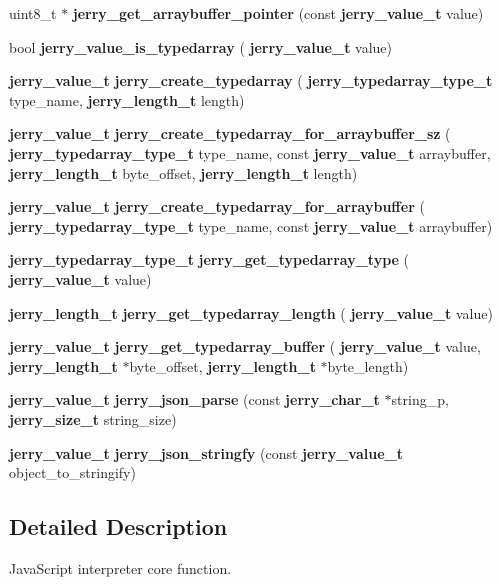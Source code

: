\begin{DoxyCompactItemize}
\item 
uint8\+\_\+t $\ast$ {\bfseries jerry\+\_\+get\+\_\+arraybuffer\+\_\+pointer} (const \textbf{ jerry\+\_\+value\+\_\+t} value)
\item 
bool {\bfseries jerry\+\_\+value\+\_\+is\+\_\+typedarray} (\textbf{ jerry\+\_\+value\+\_\+t} value)
\item 
\textbf{ jerry\+\_\+value\+\_\+t} {\bfseries jerry\+\_\+create\+\_\+typedarray} (\textbf{ jerry\+\_\+typedarray\+\_\+type\+\_\+t} type\+\_\+name, \textbf{ jerry\+\_\+length\+\_\+t} length)
\item 
\textbf{ jerry\+\_\+value\+\_\+t} {\bfseries jerry\+\_\+create\+\_\+typedarray\+\_\+for\+\_\+arraybuffer\+\_\+sz} (\textbf{ jerry\+\_\+typedarray\+\_\+type\+\_\+t} type\+\_\+name, const \textbf{ jerry\+\_\+value\+\_\+t} arraybuffer, \textbf{ jerry\+\_\+length\+\_\+t} byte\+\_\+offset, \textbf{ jerry\+\_\+length\+\_\+t} length)
\item 
\textbf{ jerry\+\_\+value\+\_\+t} {\bfseries jerry\+\_\+create\+\_\+typedarray\+\_\+for\+\_\+arraybuffer} (\textbf{ jerry\+\_\+typedarray\+\_\+type\+\_\+t} type\+\_\+name, const \textbf{ jerry\+\_\+value\+\_\+t} arraybuffer)
\item 
\textbf{ jerry\+\_\+typedarray\+\_\+type\+\_\+t} {\bfseries jerry\+\_\+get\+\_\+typedarray\+\_\+type} (\textbf{ jerry\+\_\+value\+\_\+t} value)
\item 
\textbf{ jerry\+\_\+length\+\_\+t} {\bfseries jerry\+\_\+get\+\_\+typedarray\+\_\+length} (\textbf{ jerry\+\_\+value\+\_\+t} value)
\item 
\textbf{ jerry\+\_\+value\+\_\+t} {\bfseries jerry\+\_\+get\+\_\+typedarray\+\_\+buffer} (\textbf{ jerry\+\_\+value\+\_\+t} value, \textbf{ jerry\+\_\+length\+\_\+t} $\ast$byte\+\_\+offset, \textbf{ jerry\+\_\+length\+\_\+t} $\ast$byte\+\_\+length)
\item 
\textbf{ jerry\+\_\+value\+\_\+t} {\bfseries jerry\+\_\+json\+\_\+parse} (const \textbf{ jerry\+\_\+char\+\_\+t} $\ast$string\+\_\+p, \textbf{ jerry\+\_\+size\+\_\+t} string\+\_\+size)
\item 
\textbf{ jerry\+\_\+value\+\_\+t} {\bfseries jerry\+\_\+json\+\_\+stringfy} (const \textbf{ jerry\+\_\+value\+\_\+t} object\+\_\+to\+\_\+stringify)
\end{DoxyCompactItemize}


\subsection{Detailed Description}
Java\+Script interpreter core function. 

